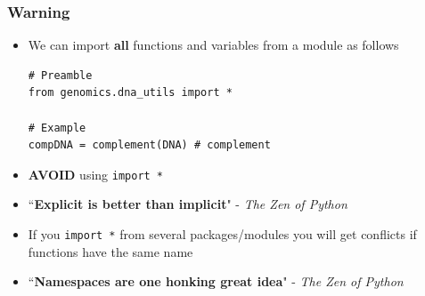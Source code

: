 \documentclass[xcolor=table]{beamer}
\begin{document}
\begin{frame}[fragile]
\frametitle{Warning}

\begin{itemize}\addtolength{\itemsep}{0.8\baselineskip}

\item <1-> We can import \textbf{all} functions and variables from a module as follows
\begin{lstlisting}[style=python]
# Preamble
from genomics.dna_utils import *

# Example
compDNA = complement(DNA) # complement
\end{lstlisting}
\vspace{-0.7cm}
\item<2-> \textbf{AVOID} using \texttt{import *}

\item<3-> ``\textbf{Explicit is better than implicit}" - {\scriptsize \textit{The Zen of Python}}

\item<4-> If you \texttt{import *} from several packages/modules you will get conflicts
if functions have the same name 

\item<5-> ``\textbf{Namespaces are one honking great idea}" - {\scriptsize \textit{The Zen of Python}}

\end{itemize}

\end{frame}
\end{document}

